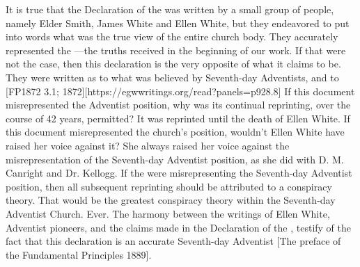It is true that the Declaration of the  was written by a small group of people, namely Elder Smith, James White and Ellen White, but they endeavored to put into words what was the true view of the entire church body. They accurately represented the —the truths received in the beginning of our work. If that were not the case, then this declaration is the very opposite of what it claims to be. They were written  as to what was believed by Seventh-day Adventists,  and to [FP1872 3.1; 1872][https://egwwritings.org/read?panels=p928.8] If this document misrepresented the Adventist position, why was its continual reprinting, over the course of 42 years, permitted? It was reprinted until the death of Ellen White. If this document misrepresented the church’s position, wouldn’t Ellen White have raised her voice against it? She always raised her voice against the misrepresentation of the Seventh-day Adventist position, as she did with D. M. Canright and Dr. Kellogg. If the  were misrepresenting the Seventh-day Adventist position, then all subsequent reprinting should be attributed to a conspiracy theory. That would be the greatest conspiracy theory within the Seventh-day Adventist Church. Ever. The harmony between the writings of Ellen White, Adventist pioneers, and the claims made in the Declaration of the , testify of the fact that this declaration is an accurate  Seventh-day Adventist [The preface of the Fundamental Principles 1889].


